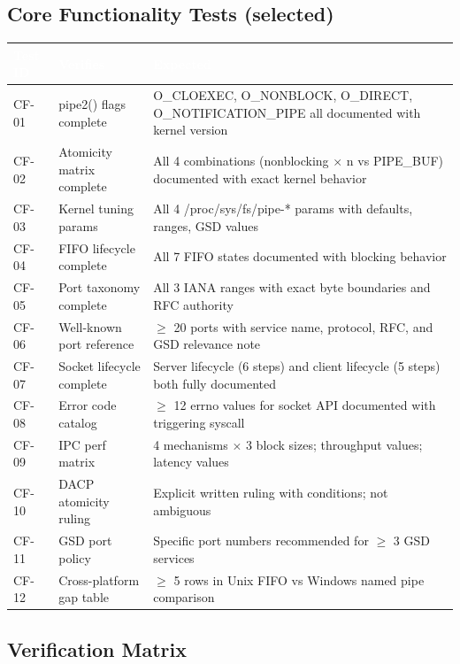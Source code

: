 \documentclass[11pt,letterpaper]{article}
\newcommand{\tableheader}[1]{\textbf{\sffamily\textcolor{white}{#1}}}
\begin{document}
\subsection{Core Functionality Tests (selected)}

\begin{center}
\begin{tabularx}{\textwidth}{C{1.5cm}L{4cm}X}
\toprule
{}
\tableheader{Test ID} & \tableheader{Verifies} & \tableheader{Expected} \\
\midrule
CF-01 & pipe2() flags complete & O\_CLOEXEC, O\_NONBLOCK, O\_DIRECT, O\_NOTIFICATION\_PIPE all documented with kernel version \\
CF-02 & Atomicity matrix complete & All 4 combinations (nonblocking $\times$ n vs PIPE\_BUF) documented with exact kernel behavior \\
CF-03 & Kernel tuning params & All 4 /proc/sys/fs/pipe-* params with defaults, ranges, GSD values \\
CF-04 & FIFO lifecycle complete & All 7 FIFO states documented with blocking behavior \\
CF-05 & Port taxonomy complete & All 3 IANA ranges with exact byte boundaries and RFC authority \\
CF-06 & Well-known port reference & $\geq$ 20 ports with service name, protocol, RFC, and GSD relevance note \\
CF-07 & Socket lifecycle complete & Server lifecycle (6 steps) and client lifecycle (5 steps) both fully documented \\
CF-08 & Error code catalog & $\geq$ 12 errno values for socket API documented with triggering syscall \\
CF-09 & IPC perf matrix & 4 mechanisms $\times$ 3 block sizes; throughput values; latency values \\
CF-10 & DACP atomicity ruling & Explicit written ruling with conditions; not ambiguous \\
CF-11 & GSD port policy & Specific port numbers recommended for $\geq$ 3 GSD services \\
CF-12 & Cross-platform gap table & $\geq$ 5 rows in Unix FIFO vs Windows named pipe comparison \\
\bottomrule
\end{tabularx}
\end{center}

\subsection{Verification Matrix}
\end{document}
